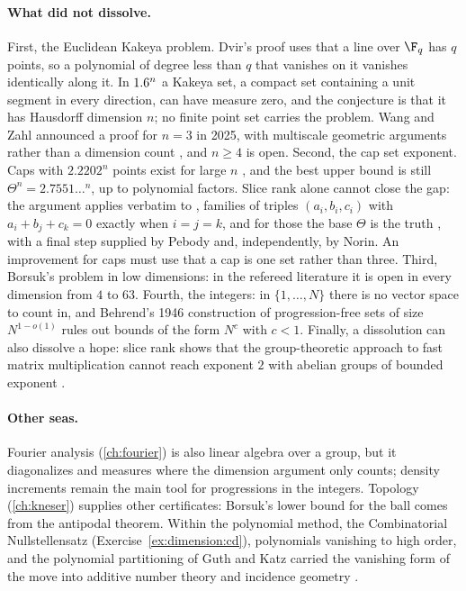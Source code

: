 \begin{refsection}
\paragraph{What did not dissolve.}
First, the Euclidean Kakeya problem. Dvir's proof uses that a line over $\F_q$ has $q$ points, so a polynomial of degree less than $q$ that vanishes on it vanishes identically along it. In $1.6^n$ a Kakeya set, a compact set containing a unit segment in every direction, can have measure zero, and the conjecture is that it has Hausdorff dimension $n$; no finite point set carries the problem. Wang and Zahl announced a proof for $n=3$ in 2025, with multiscale geometric arguments rather than a dimension count \parencite{WangZahl2025}, and $n\ge4$ is open. Second, the cap set exponent. Caps with $2.2202^n$ points exist for large $n$ \parencite{RomeraParedesEtAl2024}, and the best upper bound is still $\Theta^n=2.7551\ldots^n$, up to polynomial factors. Slice rank alone cannot close the gap: the argument applies verbatim to , families of triples $(a_i,b_i,c_i)$ with $a_i+b_j+c_k=0$ exactly when $i=j=k$, and for those the base $\Theta$ is the truth \parencite{KleinbergSawinSpeyer2018}, with a final step supplied by Pebody and, independently, by Norin. An improvement for caps must use that a cap is one set rather than three. Third, Borsuk's problem in low dimensions: in the refereed literature it is open in every dimension from $4$ to $63$. Fourth, the integers: in $\{1,\dots,N\}$ there is no vector space to count in, and Behrend's 1946 construction of progression-free sets of size $N^{1-o(1)}$ rules out bounds of the form $N^c$ with $c<1$. Finally, a dissolution can also dissolve a hope: slice rank shows that the group-theoretic approach to fast matrix multiplication cannot reach exponent $2$ with abelian groups of bounded exponent \parencite{BlasiakEtAl2017}.

\paragraph{Other seas.}
Fourier analysis (\cref{ch:fourier}) is also linear algebra over a group, but it diagonalizes and measures where the dimension argument only counts; density increments remain the main tool for progressions in the integers. Topology (\cref{ch:kneser}) supplies other certificates: Borsuk's lower bound for the ball comes from the antipodal theorem. Within the polynomial method, the Combinatorial Nullstellensatz (Exercise~\ref{ex:dimension:cd}), polynomials vanishing to high order, and the polynomial partitioning of Guth and Katz carried the vanishing form of the move into additive number theory and incidence geometry \parencite{Guth2016}.


\end{refsection}
